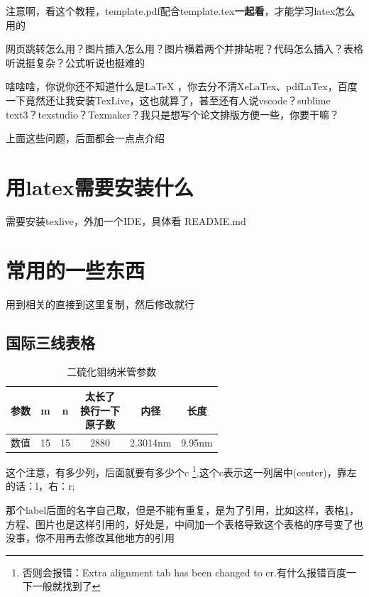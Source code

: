 \documentclass[AutoFakeBold]{LZUThesis}
\begin{document}
注意啊，看这个教程，template.pdf配合template.tex\textbf{一起看}，才能学习latex怎么用的

网页跳转怎么用？图片插入怎么用？图片横着两个并排站呢？代码怎么插入？表格听说挺复杂？公式听说也挺难的

啥啥啥，你说你还不知道什么是LaTeX ，你去分不清XeLaTex、pdfLaTex，百度一下竟然还让我安装TexLive，这也就算了，甚至还有人说vscode？sublime text3？texstudio？Texmaker？我只是想写个论文排版方便一些，你要干嘛？

上面这些问题，后面都会一点点介绍

\section{用latex需要安装什么}

需要安装texlive，外加一个IDE，具体看 README.md


\section{常用的一些东西} %
\label{sec:常用的一些东西}

用到相关的直接到这里复制，然后修改就行

\subsection{国际三线表格} %
\label{sub:国际三线表格}

\begin{table}[H]
    \centering
    \caption{二硫化钼纳米管参数}
    \begin{tabular}{cccccc} %
        \toprule
        参数 & m  & n  & \tabincell{c}{太长了                     \\换行一下\\原子数}  & 内径 & 长度\\
        \midrule
        数值 & 15 & 15 & 2880              & 2.3014nm & 9.95nm \\
        \bottomrule
    \end{tabular}
    \label{tbl_mos2_nanotube}
\end{table}

这个注意，有多少列，后面就要有多少个c \footnote{否则会报错：Extra alignment tab has been changed to cr.有什么报错百度一下一般就找到了},这个c表示这一列居中(center)，靠左的话：l，右：r;

那个label后面的名字自己取，但是不能有重复，是为了引用，比如这样，表格\ref{tbl_mos2_nanotube}，方程、图片也是这样引用的，好处是，中间加一个表格导致这个表格的序号变了也没事，你不用再去修改其他地方的引用
\end{document}
